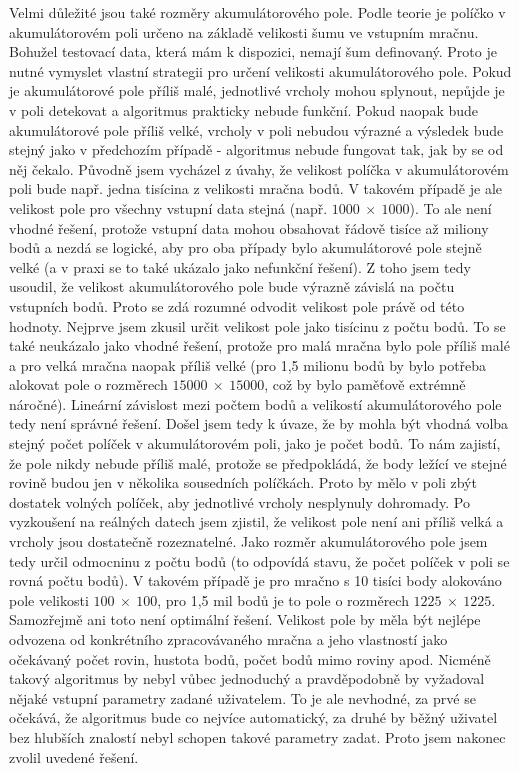 \documentclass[11pt,twoside,a4paper]{book}
\begin{document}
Velmi důležité jsou také rozměry akumulátorového pole. Podle teorie je políčko v akumulátorovém poli určeno na základě velikosti šumu ve vstupním mračnu. Bohužel testovací data, která mám k dispozici, nemají šum definovaný. Proto je nutné vymyslet vlastní strategii pro určení velikosti akumulátorového pole. Pokud je akumulátorové pole příliš malé, jednotlivé vrcholy mohou splynout, nepůjde je v poli detekovat a algoritmus prakticky nebude funkční. Pokud naopak bude akumulátorové pole příliš velké, vrcholy v poli nebudou výrazné a výsledek bude stejný jako v předchozím případě - algoritmus nebude fungovat tak, jak by se od něj čekalo. Původně jsem vycházel z úvahy, že velikost políčka v akumulátorovém poli bude např. jedna tisícina z velikosti mračna bodů. V takovém případě je ale velikost pole pro všechny vstupní data stejná (např. $1000~\times~1000$). To ale není vhodné řešení, protože vstupní data mohou obsahovat řádově tisíce až miliony bodů a nezdá se logické, aby pro oba případy bylo akumulátorové pole stejně velké (a v praxi se to také ukázalo jako nefunkční řešení). Z toho jsem tedy usoudil, že velikost akumulátorového pole bude výrazně závislá na počtu vstupních bodů. Proto se zdá rozumné odvodit velikost pole právě od této hodnoty. Nejprve jsem zkusil určit velikost pole jako tisícinu z počtu bodů. To se také neukázalo jako vhodné řešení, protože pro malá mračna bylo pole příliš malé a pro velká mračna naopak příliš velké (pro 1,5 milionu bodů by bylo potřeba alokovat pole o rozměrech $15000~\times~15000$, což by bylo paměťově extrémně náročné). Lineární závislost mezi počtem bodů a velikostí akumulátorového pole tedy není správné řešení. Došel jsem tedy k úvaze, že by mohla být vhodná volba stejný počet políček v akumulátorovém poli, jako je počet bodů. To nám zajistí, že pole nikdy nebude příliš malé, protože se předpokládá, že body ležící ve stejné rovině budou jen v několika sousedních políčkách. Proto by mělo v poli zbýt dostatek volných políček, aby jednotlivé vrcholy nesplynuly dohromady. Po vyzkoušení na reálných datech jsem zjistil, že velikost pole není ani příliš velká a vrcholy jsou dostatečně rozeznatelné. Jako rozměr akumulátorového pole jsem tedy určil odmocninu z počtu bodů (to odpovídá stavu, že počet políček v poli se rovná počtu bodů). V takovém případě je pro mračno s 10 tisíci body alokováno pole velikosti $100~\times~100$, pro 1,5 mil bodů je to pole o rozměrech $1225~\times~1225$. Samozřejmě ani toto není optimální řešení. Velikost pole by měla být nejlépe odvozena od konkrétního zpracovávaného mračna a jeho vlastností jako očekávaný počet rovin, hustota bodů, počet bodů mimo roviny apod. Nicméně takový algoritmus by nebyl vůbec jednoduchý a pravděpodobně by vyžadoval nějaké vstupní parametry zadané uživatelem. To je ale nevhodné, za prvé se očekává, že algoritmus bude co nejvíce automatický, za druhé by běžný uživatel bez hlubších znalostí nebyl schopen takové parametry zadat. Proto jsem nakonec zvolil uvedené řešení.
\end{document}
